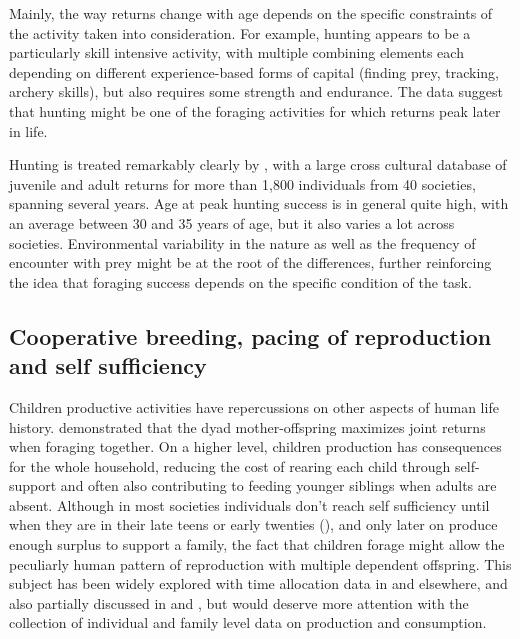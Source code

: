 Mainly, the way returns change with age depends on the specific constraints of the activity taken into consideration. For example, hunting appears to be a particularly skill intensive activity, with multiple combining elements each depending on different experience-based forms of capital (finding prey, tracking, archery skills), but also requires some strength and endurance. The data suggest that hunting might be one of the foraging activities for which returns peak later in life. 

Hunting is treated remarkably clearly by \cite{koster_life_2020}, with a large cross cultural database of juvenile and adult returns for more than 1,800 individuals from 40 societies, spanning several years. Age at peak hunting success is in general quite high, with an average between 30 and 35 years of age, but it also varies a lot across societies. Environmental variability in the nature as well as the frequency of encounter with prey might be at the root of the differences, further reinforcing the idea that foraging success depends on the specific condition of the task.

\subsection{Cooperative breeding, pacing of reproduction and self sufficiency}

Children productive activities have repercussions on other aspects of human life history. \cite{hawkes_hadza_1995} demonstrated that the dyad mother-offspring maximizes joint returns when foraging together. On a higher level, children production has consequences for the whole household, reducing the cost of rearing each child through self-support and often also contributing to feeding younger siblings when adults are absent. Although in most societies individuals don't reach self sufficiency until when they are in their late teens or early twenties (\cite{kaplan_evolution_1997}), and only later on produce enough surplus to support a family, the fact that children forage might allow the peculiarly human pattern of reproduction with multiple dependent offspring. This subject has been widely explored with time allocation data in \cite{kramer_variation_2002, kramer_maya_2005, kramer_childrens_2005, kramer_does_2009} and elsewhere, and also partially discussed in \cite{crittenden_juvenile_2013} and \cite{bird_constraints_2002}, but would deserve more attention with the collection of individual and family level data on production and consumption. 


